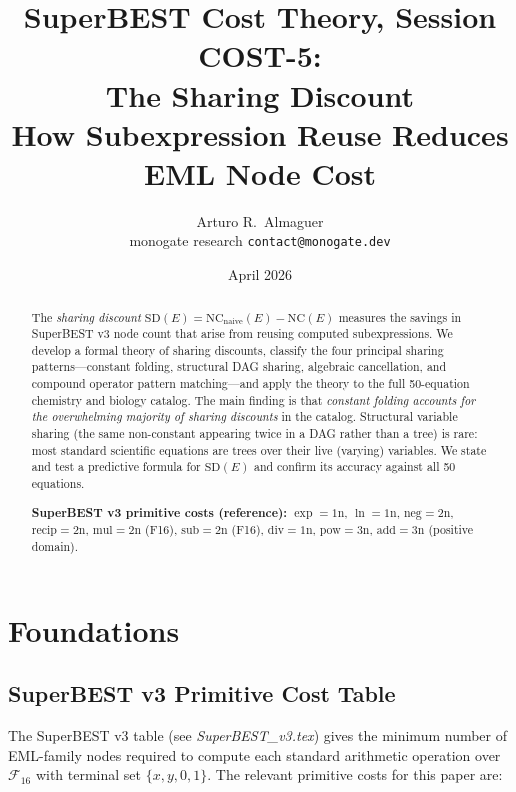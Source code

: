 \documentclass[12pt,a4paper]{article}
\title{SuperBEST Cost Theory, Session COST-5:\\
       The Sharing Discount\\[6pt]
       \large How Subexpression Reuse Reduces EML Node Cost}
\author{Arturo R.\ Almaguer\\
\small monogate research \quad \texttt{contact@monogate.dev}}
\date{April 2026}
\theoremstyle{definition}
\newcommand{\NC}{\mathrm{NC}}
\newcommand{\SD}{\mathrm{SD}}
\begin{document}
\maketitle

\begin{abstract}
The \emph{sharing discount} $\SD(E) = \NC_{\mathrm{naive}}(E) - \NC(E)$
measures the savings in SuperBEST v3 node count that arise from reusing
computed subexpressions.  We develop a formal theory of sharing discounts,
classify the four principal sharing patterns---constant folding, structural
DAG sharing, algebraic cancellation, and compound operator pattern
matching---and apply the theory to the full 50-equation chemistry and
biology catalog.  The main finding is that \emph{constant folding accounts
for the overwhelming majority of sharing discounts} in the catalog.
Structural variable sharing (the same non-constant appearing twice in a DAG
rather than a tree) is rare: most standard scientific equations are trees over
their live (varying) variables.  We state and test a predictive formula for
$\SD(E)$ and confirm its accuracy against all 50 equations.

\medskip
\noindent\textbf{SuperBEST v3 primitive costs (reference):}
$\exp = 1\mathrm{n}$, $\ln = 1\mathrm{n}$, $\mathrm{neg} = 2\mathrm{n}$,
$\mathrm{recip} = 2\mathrm{n}$, $\mathrm{mul} = 2\mathrm{n}$ (F16),
$\mathrm{sub} = 2\mathrm{n}$ (F16), $\mathrm{div} = 1\mathrm{n}$,
$\mathrm{pow} = 3\mathrm{n}$, $\mathrm{add} = 3\mathrm{n}$ (positive
domain).
\end{abstract}

\tableofcontents
\newpage

\section{Foundations}
\label{sec:foundations}

\subsection{SuperBEST v3 Primitive Cost Table}

The SuperBEST v3 table (see \textit{SuperBEST\_v3.tex}) gives the minimum
number of EML-family nodes required to compute each standard arithmetic
operation over $\mathcal{F}_{16}$ with terminal set $\{x, y, 0, 1\}$.
The relevant primitive costs for this paper are:
\end{document}
